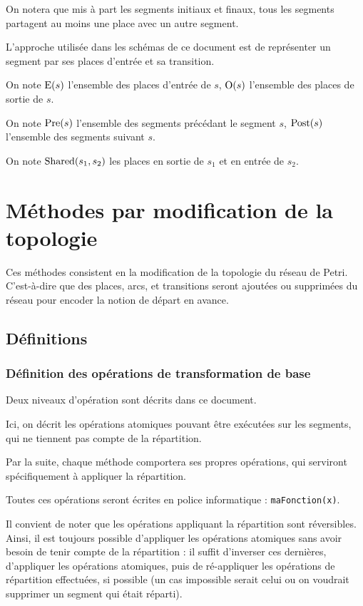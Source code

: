 On notera que mis à part les segments initiaux et finaux, tous les segments partagent au moins une place avec un autre segment.

L'approche utilisée dans les schémas de ce document est de représenter un segment par ses places d'entrée et sa transition.

\begin{mynot}
On note $\operatorname{E}(s)$ l'ensemble des places d'entrée de $s$, $\operatorname{O}(s)$ l'ensemble des places de sortie de $s$.
\end{mynot}

\begin{mynot}
On note $\operatorname{Pre}(s)$ l'ensemble des segments précédant le segment $s$, $\operatorname{Post}(s)$ l'ensemble des segments suivant $s$.
\end{mynot}

\begin{mynot}
On note $\operatorname{Shared}(s_1, s_2)$ les places en sortie de $s_1$ et en entrée de $s_2$.
\end{mynot}

\section{Méthodes par modification de la topologie}
Ces méthodes consistent en la modification de la topologie du réseau de Petri. C'est-à-dire que des places, arcs, et transitions seront ajoutées ou supprimées du réseau pour encoder la notion de départ en avance.

\subsection{Définitions}
\subsubsection{Définition des opérations de transformation de base}
Deux niveaux d'opération sont décrits dans ce document.

Ici, on décrit les opérations atomiques pouvant être exécutées sur les segments, qui ne tiennent pas compte de la répartition. 

Par la suite, chaque méthode comportera ses propres opérations, qui serviront spécifiquement à appliquer la répartition. 

Toutes ces opérations seront écrites en police informatique : \texttt{maFonction(x)}.

Il convient de noter que les opérations appliquant la répartition sont réversibles. Ainsi, il est toujours possible d'appliquer les opérations atomiques sans avoir besoin de tenir compte de la répartition : il suffit d'inverser ces dernières, d'appliquer les opérations atomiques, puis de ré-appliquer les opérations de répartition effectuées, si possible (un cas impossible serait celui ou on voudrait supprimer un segment qui était réparti).

